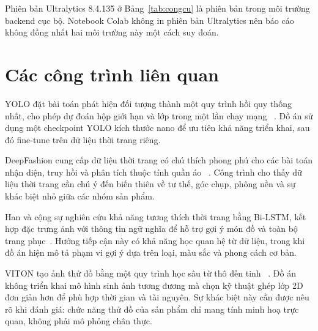 Phiên bản Ultralytics 8.4.135 ở Bảng~\ref{tab:congcu} là phiên bản trong
môi trường backend cục bộ. Notebook Colab không in phiên bản Ultralytics nên
báo cáo không đồng nhất hai môi trường này một cách suy đoán.

\section{Các công trình liên quan}

YOLO đặt bài toán phát hiện đối tượng thành một quy trình hồi quy thống nhất,
cho phép dự đoán hộp giới hạn và lớp trong một lần chạy mạng
~\cite{Redmon2016}. Đồ án sử dụng một checkpoint YOLO kích thước nano để ưu
tiên khả năng triển khai, sau đó fine-tune trên dữ liệu thời trang riêng.

DeepFashion cung cấp dữ liệu thời trang có chú thích phong phú cho các bài
toán nhận diện, truy hồi và phân tích thuộc tính quần áo
~\cite{DeepFashion2016}. Công trình cho thấy dữ liệu thời trang cần chú ý
đến biến thiên về tư thế, góc chụp, phông nền và sự khác biệt nhỏ giữa các
nhóm sản phẩm.

Han và cộng sự nghiên cứu khả năng tương thích thời trang bằng Bi-LSTM,
kết hợp đặc trưng ảnh với thông tin ngữ nghĩa để hỗ trợ gợi ý món đồ và toàn
bộ trang phục~\cite{Han2017}. Hướng tiếp cận này có khả năng học quan hệ từ
dữ liệu, trong khi đồ án hiện mô tả phạm vi gợi ý dựa trên loại, màu sắc và
phong cách cơ bản.

VITON tạo ảnh thử đồ bằng một quy trình học sâu từ thô đến tinh
~\cite{VITON2018}. Đồ án không triển khai mô hình sinh ảnh tương đương mà
chọn kỹ thuật ghép lớp 2D đơn giản hơn để phù hợp thời gian và tài nguyên.
Sự khác biệt này cần được nêu rõ khi đánh giá: chức năng thử đồ của sản phẩm
chỉ mang tính minh hoạ trực quan, không phải mô phỏng chân thực.
